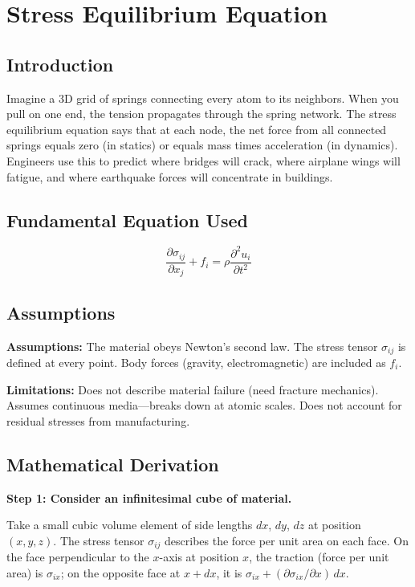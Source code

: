 \chapter{Stress Equilibrium Equation}

\section*{Introduction}

Imagine a 3D grid of springs connecting every atom to its neighbors. When you pull on one end, the tension propagates through the spring network. The stress equilibrium equation says that at each node, the net force from all connected springs equals zero (in statics) or equals mass times acceleration (in dynamics). Engineers use this to predict where bridges will crack, where airplane wings will fatigue, and where earthquake forces will concentrate in buildings.
\section*{Fundamental Equation Used}

\[
\frac{\partial \sigma_{ij}}{\partial x_j} + f_i = \rho \frac{\partial^2 u_i}{\partial t^2}
\]
\section*{Assumptions}

\textbf{Assumptions:} The material obeys Newton's second law. The stress tensor $\sigma_{ij}$ is defined at every point. Body forces (gravity, electromagnetic) are included as $f_i$.


\textbf{Limitations:} Does not describe material failure (need fracture mechanics). Assumes continuous media---breaks down at atomic scales. Does not account for residual stresses from manufacturing.


\section*{Mathematical Derivation}

\textbf{Step 1: Consider an infinitesimal cube of material.}

Take a small cubic volume element of side lengths $dx$, $dy$, $dz$ at position $(x, y, z)$. The stress tensor $\sigma_{ij}$ describes the force per unit area on each face. On the face perpendicular to the $x$-axis at position $x$, the traction (force per unit area) is $\sigma_{ix}$; on the opposite face at $x + dx$, it is $\sigma_{ix} + (\partial\sigma_{ix}/\partial x)\,dx$.

